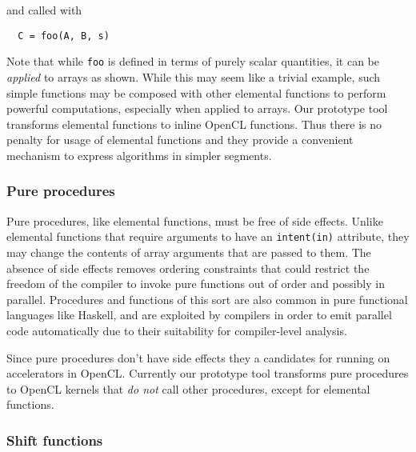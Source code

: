 \noindent and called with

{\small
\begin{verbatim}
  C = foo(A, B, s)
\end{verbatim}
}

Note that while {\tt foo} is defined in terms of purely scalar
quantities, it can be \emph{applied} to arrays as shown.  While this
may seem like a trivial example, such simple functions may be composed
with other elemental functions to perform powerful computations,
especially when applied to arrays.  Our prototype tool transforms
elemental functions to inline OpenCL functions.  Thus there is no
penalty for usage of elemental functions and they provide a convenient
mechanism to express algorithms in simpler segments.


\subsubsection*{Pure procedures}

Pure procedures, like elemental functions, must be free of side
effects.  Unlike elemental functions that require arguments to have an
{\tt intent(in)} attribute, they may change the contents of array
arguments that are passed to them.  The absence of side effects
removes ordering constraints that could restrict the freedom of the
compiler to invoke pure functions out of order and possibly in parallel.
Procedures and functions of this sort are also common in pure
functional languages like Haskell, and are exploited by compilers in
order to emit parallel code automatically due to their suitability for
compiler-level analysis.

Since pure procedures don't have side effects they a candidates for
running on accelerators in OpenCL.  Currently our prototype tool
transforms pure procedures to OpenCL kernels that \emph{do not} call
other procedures, except for elemental functions.

\subsubsection*{Shift functions}

